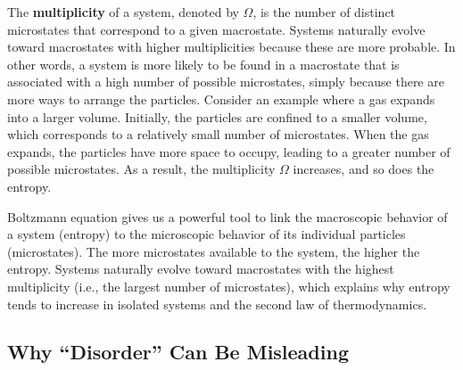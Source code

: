 \documentclass[
  9pt,
]{extbook}
\theoremstyle{definition}
\theoremstyle{definition}
\theoremstyle{definition}
\theoremstyle{definition}
\theoremstyle{remark}
\begin{document}
The \textbf{multiplicity} of a system, denoted by \(\Omega\), is the number of distinct microstates that correspond to a given macrostate. Systems naturally evolve toward macrostates with higher multiplicities because these are more probable. In other words, a system is more likely to be found in a macrostate that is associated with a high number of possible microstates, simply because there are more ways to arrange the particles. Consider an example where a gas expands into a larger volume. Initially, the particles are confined to a smaller volume, which corresponds to a relatively small number of microstates. When the gas expands, the particles have more space to occupy, leading to a greater number of possible microstates. As a result, the multiplicity \(\Omega\) increases, and so does the entropy.

Boltzmann equation gives us a powerful tool to link the macroscopic behavior of a system (entropy) to the microscopic behavior of its individual particles (microstates). The more microstates available to the system, the higher the entropy. Systems naturally evolve toward macrostates with the highest multiplicity (i.e., the largest number of microstates), which explains why entropy tends to increase in isolated systems and the second law of thermodynamics.

\subsection{Why ``Disorder'' Can Be Misleading}\label{why-disorder-can-be-misleading}
\end{document}
